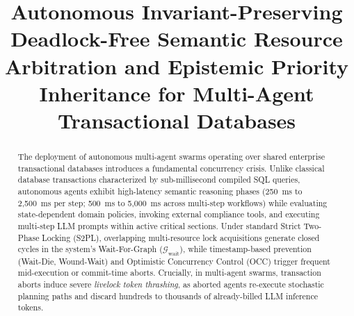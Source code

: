 \documentclass[conference,10pt]{IEEEtran}
\begin{document}
\title{Autonomous Invariant-Preserving Deadlock-Free Semantic Resource Arbitration and Epistemic Priority Inheritance for Multi-Agent Transactional Databases}

\author{
}

\maketitle

\begin{abstract}
The deployment of autonomous multi-agent swarms operating over shared enterprise transactional databases introduces a fundamental concurrency crisis. Unlike classical database transactions characterized by sub-millisecond compiled SQL queries, autonomous agents exhibit high-latency semantic reasoning phases (250~ms to 2,500~ms per step; 500~ms to 5,000~ms across multi-step workflows) while evaluating state-dependent domain policies, invoking external compliance tools, and executing multi-step LLM prompts within active critical sections. Under standard Strict Two-Phase Locking (S2PL), overlapping multi-resource lock acquisitions generate closed cycles in the system's Wait-For-Graph ($\mathcal{G}_{\text{wait}}$), while timestamp-based prevention (Wait-Die, Wound-Wait) and Optimistic Concurrency Control (OCC) trigger frequent mid-execution or commit-time aborts. Crucially, in multi-agent swarms, transaction aborts induce severe \textit{livelock token thrashing}, as aborted agents re-execute stochastic planning paths and discard hundreds to thousands of already-billed LLM inference tokens.


\end{abstract}
\end{document}

